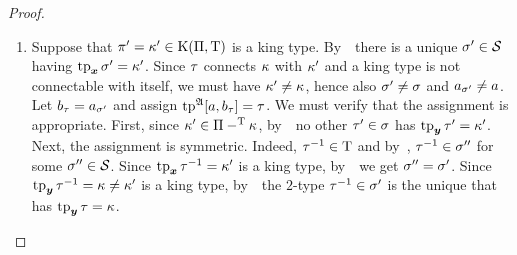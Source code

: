 \begin{proof}
\begin{description}
  \begin{enumerate}
  \item 
  Suppose that ${\pi'} = {\kappa'} \in \mathrm{K}(\Pi,\mathrm{T})$ is a king type.
  By~~there is a unique ${\sigma'} \in \mathcal{S}$ having $\operatorname{tp}_{\bm{x}}{\sigma'} =
  {\kappa'}$.
  Since $\tau$ connects $\kappa$ with ${\kappa'}$ and a king
  type is not connectable with itself, we must have ${\kappa'} \neq \kappa$, hence
  also ${\sigma'} \neq \sigma$ and $a_{{\sigma'}} \neq a$.
  Let $b_{\tau} = a_{{\sigma'}}$ and assign $\operatorname{tp}^{\mathfrak{A}}[a,b_{\tau}] = \tau$.
  We must verify that the assignment is appropriate.
  First, since ${\kappa'} \in \Pi -^{\mathrm{T}} \kappa$, by~~no other
  ${\tau'} \in \sigma$ has $\operatorname{tp}_{\bm{y}}{\tau'} = {\kappa'}$.
  Next, the assignment is symmetric.
  Indeed, $\tau^{-1} \in \mathrm{T}$ and by~, $\tau^{-1} \in \sigma''$
  for some $\sigma'' \in \mathcal{S}$. Since $\operatorname{tp}_{\bm{x}}\tau^{-1} = {\kappa'}$ is a king type,
  by~~we get $\sigma'' = {\sigma'}$. Since $\operatorname{tp}_{\bm{y}}\tau^{-1} = \kappa
  \neq {\kappa'}$ is a king type, by~~the $2$-type $\tau^{-1} \in
  {\sigma'}$ is the unique that has $\operatorname{tp}_{\bm{y}}\tau = \kappa$.
  

\end{enumerate}
\end{description}
\end{proof}
